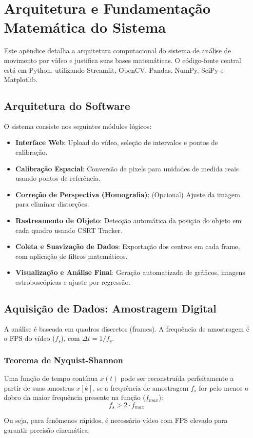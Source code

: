 \chapter{Arquitetura e Fundamentação Matemática do Sistema}

Este apêndice detalha a arquitetura computacional do sistema de análise de movimento por vídeo e justifica suas bases matemáticas. O código-fonte central está em Python, utilizando Streamlit, OpenCV, Pandas, NumPy, SciPy e Matplotlib.

\section{Arquitetura do Software}
O sistema consiste nos seguintes módulos lógicos:
\begin{itemize}
    \item \textbf{Interface Web}: Upload do vídeo, seleção de intervalos e pontos de calibração.
    \item \textbf{Calibração Espacial}: Conversão de pixels para unidades de medida reais usando pontos de referência.
    \item \textbf{Correção de Perspectiva (Homografia)}: (Opcional) Ajuste da imagem para eliminar distorções.
    \item \textbf{Rastreamento de Objeto}: Detecção automática da posição do objeto em cada quadro usando CSRT Tracker.
    \item \textbf{Coleta e Suavização de Dados}: Exportação dos centros em cada frame, com aplicação de filtros matemáticos.
    \item \textbf{Visualização e Análise Final}: Geração automatizada de gráficos, imagens estroboscópicas e ajuste por regressão.
\end{itemize}

\section{Aquisição de Dados: Amostragem Digital}
A análise é baseada em quadros discretos (frames). A frequência de amostragem é o FPS do vídeo ($f_s$), com $\Delta t = 1/f_s$.
\subsection{Teorema de Nyquist-Shannon}
\begin{tcolorbox}[title=Teorema de Nyquist-Shannon]
Uma função de tempo contínua $x(t)$ pode ser reconstruída perfeitamente a partir de suas amostras $x[k]$, se a frequência de amostragem $f_s$ for pelo menos o dobro da maior frequência presente na função ($f_{max}$):
\begin{equation}
    f_s > 2 \cdot f_{max}
\end{equation}
\end{tcolorbox}
Ou seja, para fenômenos rápidos, é necessário vídeo com FPS elevado para garantir precisão cinemática.

